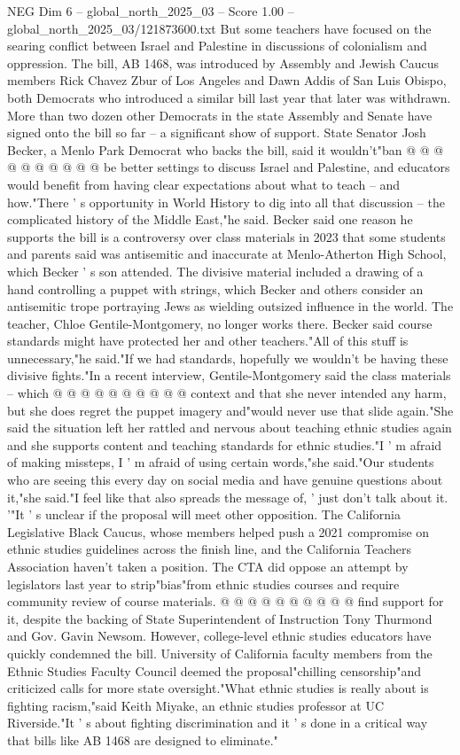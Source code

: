 \begin{textsample}{NEG Dim 6 – global\_north\_2025\_03 – Score 1.00 – global\_north\_2025\_03/121873600.txt}
But some teachers have focused on the searing conflict between Israel and Palestine in discussions of colonialism and oppression.
The bill, AB 1468, was introduced by Assembly and Jewish Caucus members Rick Chavez Zbur of Los Angeles and Dawn Addis of San Luis Obispo, both Democrats who introduced a similar bill last year that later was withdrawn.
More than two dozen other Democrats in the state Assembly and Senate have signed onto the bill so far -- a significant show of support.
State Senator Josh Becker, a Menlo Park Democrat who backs the bill, said it wouldn't"ban @ @ @ @ @ @ @ @ @ @ be better settings to discuss Israel and Palestine, and educators would benefit from having clear expectations about what to teach -- and how."There ' s opportunity in World History to dig into all that discussion -- the complicated history of the Middle East,"he said.
Becker said one reason he supports the bill is a controversy over class materials in 2023 that some students and parents said was antisemitic and inaccurate at Menlo-Atherton High School, which Becker ' s son attended.
The divisive material included a drawing of a hand controlling a puppet with strings, which Becker and others consider an antisemitic trope portraying Jews as wielding outsized influence in the world.
The teacher, Chloe Gentile-Montgomery, no longer works there.
Becker said course standards might have protected her and other teachers."All of this stuff is unnecessary,"he said."If we had standards, hopefully we wouldn't be having these divisive fights."In a recent interview, Gentile-Montgomery said the class materials -- which @ @ @ @ @ @ @ @ @ @ context and that she never intended any harm, but she does regret the puppet imagery and"would never use that slide again."She said the situation left her rattled and nervous about teaching ethnic studies again and she supports content and teaching standards for ethnic studies."I ' m afraid of making missteps, I ' m afraid of using certain words,"she said."Our students who are seeing this every day on social media and have genuine questions about it,"she said."I feel like that also spreads the message of, ' just don't talk about it. '"It ' s unclear if the proposal will meet other opposition.
The California Legislative Black Caucus, whose members helped push a 2021 compromise on ethnic studies guidelines across the finish line, and the California Teachers Association haven't taken a position.
The CTA did oppose an attempt by legislators last year to strip"bias"from ethnic studies courses and require community review of course materials. @ @ @ @ @ @ @ @ @ @ find support for it, despite the backing of State Superintendent of Instruction Tony Thurmond and Gov.
Gavin Newsom.
However, college-level ethnic studies educators have quickly condemned the bill.
University of California faculty members from the Ethnic Studies Faculty Council deemed the proposal"chilling censorship"and criticized calls for more state oversight."What ethnic studies is really about is fighting racism,"said Keith Miyake, an ethnic studies professor at UC Riverside."It ' s about fighting discrimination and it ' s done in a critical way that bills like AB 1468 are designed to eliminate."

\end{textsample}
